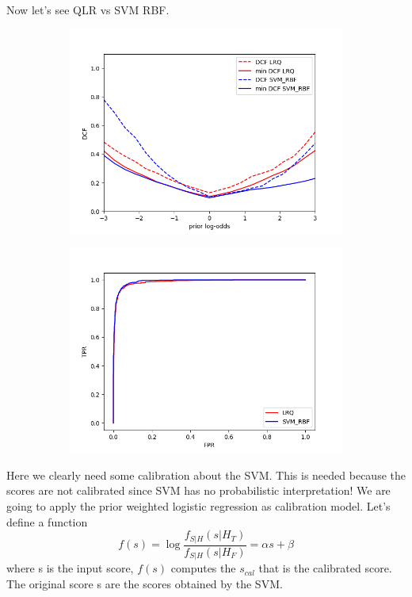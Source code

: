 \documentclass[english]{report}
\begin{document}
Now let's see QLR vs SVM RBF\@.

\begin{figure}[h!]
    \begin{subfigure}{0.5\textwidth}
        \includegraphics[scale=0.5]{../../images/comparison/validation/DCF_LRQ&SVM_RBF}
    \end{subfigure}
    \begin{subfigure}{0.5\textwidth}
        \includegraphics[scale=0.5]{../../images/comparison/validation/ROC_LRQ&SVM_RBF}
    \end{subfigure}
    \label{fig:MVGvsSVM}
\end{figure}
Here we clearly need some calibration about the SVM. This is needed because the scores are not calibrated
since SVM has no probabilistic interpretation!
We are going to apply the prior weighted logistic regression as calibration model.
Let's define a function \[f(s) = \log\frac{f_{S|H}(s|H_T)}{f_{S|H}(s|H_F)} = \alpha s + \beta\]
where s is the input score, $f(s)$ computes the $s_{cal}$ that is the calibrated score.
The original score s are the scores obtained by the SVM\@.
\end{document}
